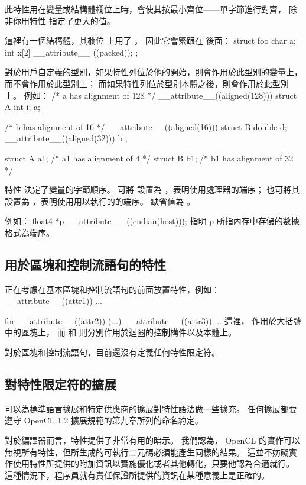 此特性用在變量或結構體欄位上時，會使其按最小齊位——單字節進行對齊，
除非你用特性  指定了更大的值。

這裡有一個結構體，其欄位  上用了 ，
因此它會緊跟在  後面：
\startclc
struct foo
{
	char a;
	int x[2] __attribute__ ((packed));
};
\stopclc
\stopclOption

對於用戶自定義的型別，如果特性列位於他的開始，則會作用於此型別的變量上，而不會作用於此型別上；
而如果特性列位於型別本體之後，則會作用於此型別上。
例如：
\startclc
/* a has alignment of 128 */
__attribute__((aligned(128))) struct A {int i;} a;

/* b has alignment of 16 */
__attribute__((aligned(16))) struct B {double d;}
			__attribute__((aligned(32))) b ;

struct A a1;	/* a1 has alignment of 4 */
struct B b1;	/* b1 has alignment of 32 */
\stopclc

特性  決定了變量的字節順序。
可將  設置為 ，表明使用處理器的端序；
也可將其設置為 ，表明使用用以執行的的端序。
缺省值為 。

例如：
\startclc
float4 *p __attribute__ ((endian(host)));
\stopclc
指明 p 所指內存中存儲的數據格式為端序。
\stopclOption

\subsection{用於區塊和控制流語句的特性}

正在考慮在基本區塊和控制流語句的前面放置特性，例如：
\startclc
__attribute__((attr1)) {...}

for __attribute__((attr2)) (...) __attribute__((attr3)) {...}
\stopclc
這裡，  作用於大括號中的區塊上，
而  和  則分別作用於迴圈的控制構件以及本體上。

對於區塊和控制流語句，目前還沒有定義任何特性限定符。

\subsection{對特性限定符的擴展}

可以為標準語言擴展和特定供應商的擴展對特性語法做一些擴充。
任何擴展都要遵守 OpenCL 1.2 擴展規範的第九章所列的命名約定。

對於編譯器而言，特性提供了非常有用的暗示。
我們認為， OpenCL 的實作可以無視所有特性，但所生成的可執行二元碼必須能產生同樣的結果。
這並不妨礙實作使用特性所提供的附加資訊以實施優化或者其他轉化，只要他認為合適就行。
這種情況下，程序員就有責任保證所提供的資訊在某種意義上是正確的。


